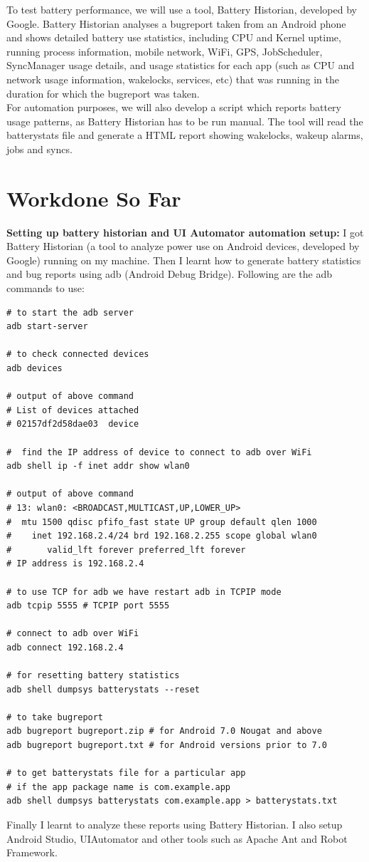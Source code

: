 \documentclass[a4paper,12pt]{article}
\begin{document}
To test battery performance, we will use a tool, Battery Historian, developed by Google. Battery Historian analyses a bugreport taken from an Android phone and shows detailed battery use statistics, including CPU and Kernel uptime, running process information, mobile network, WiFi, GPS, JobScheduler, SyncManager usage details, and usage statistics for each app (such as CPU and network usage information, wakelocks, services, etc) that was running in the duration for which the bugreport was taken.\cite{batteryhistorian} \\

For automation purposes, we will also develop a script which reports battery usage patterns, as Battery Historian has to be run manual. The tool will read the batterystats file and generate a HTML report showing wakelocks, wakeup alarms, jobs and syncs.


\section{Workdone So Far}
\textbf{Setting up battery historian and UI Automator automation setup:} I got Battery Historian (a tool to analyze power use on Android devices, developed by Google) running on my machine. Then I learnt how to generate battery statistics and bug reports using adb (Android Debug Bridge). Following are the adb commands to use:\cite{adb}
\begin{lstlisting}[style=ShellStyle]
# to start the adb server
adb start-server

# to check connected devices
adb devices

# output of above command
# List of devices attached
# 02157df2d58dae03	device

#  find the IP address of device to connect to adb over WiFi
adb shell ip -f inet addr show wlan0

# output of above command
# 13: wlan0: <BROADCAST,MULTICAST,UP,LOWER_UP> 
#  mtu 1500 qdisc pfifo_fast state UP group default qlen 1000
#    inet 192.168.2.4/24 brd 192.168.2.255 scope global wlan0
#       valid_lft forever preferred_lft forever
# IP address is 192.168.2.4

# to use TCP for adb we have restart adb in TCPIP mode
adb tcpip 5555 # TCPIP port 5555

# connect to adb over WiFi
adb connect 192.168.2.4

# for resetting battery statistics
adb shell dumpsys batterystats --reset

# to take bugreport
adb bugreport bugreport.zip # for Android 7.0 Nougat and above
adb bugreport bugreport.txt # for Android versions prior to 7.0 

# to get batterystats file for a particular app 
# if the app package name is com.example.app
adb shell dumpsys batterystats com.example.app > batterystats.txt
\end{lstlisting}
Finally I learnt to analyze these reports using Battery Historian. I also setup Android Studio, UIAutomator and other tools such as Apache Ant and Robot Framework.
\\
\end{document}
